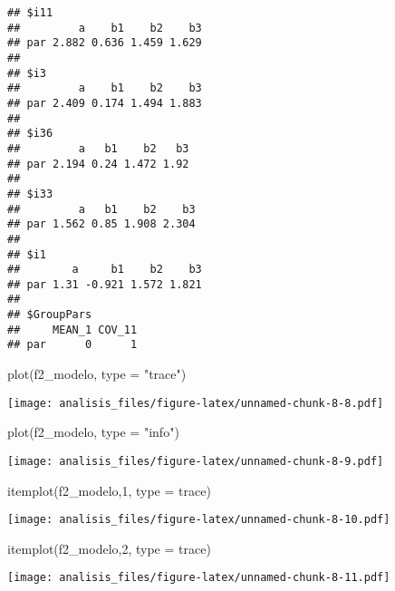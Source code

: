 \documentclass[
]{article}
\newenvironment{Shaded}{\begin{snugshade}}{\end{snugshade}}
\newcommand{\AttributeTok}[1]{\textcolor[rgb]{0.77,0.63,0.00}{#1}}
\newcommand{\DecValTok}[1]{\textcolor[rgb]{0.00,0.00,0.81}{#1}}
\newcommand{\FunctionTok}[1]{\textcolor[rgb]{0.00,0.00,0.00}{#1}}
\newcommand{\NormalTok}[1]{#1}
\newcommand{\StringTok}[1]{\textcolor[rgb]{0.31,0.60,0.02}{#1}}
\begin{document}
\begin{verbatim}
## $i11
##         a    b1    b2    b3
## par 2.882 0.636 1.459 1.629
## 
## $i3
##         a    b1    b2    b3
## par 2.409 0.174 1.494 1.883
## 
## $i36
##         a   b1    b2   b3
## par 2.194 0.24 1.472 1.92
## 
## $i33
##         a   b1    b2    b3
## par 1.562 0.85 1.908 2.304
## 
## $i1
##        a     b1    b2    b3
## par 1.31 -0.921 1.572 1.821
## 
## $GroupPars
##     MEAN_1 COV_11
## par      0      1
\end{verbatim}

\begin{Shaded}
\begin{Highlighting}[]
\FunctionTok{plot}\NormalTok{(f2\_modelo,  }\AttributeTok{type =} \StringTok{"trace"}\NormalTok{)}
\end{Highlighting}
\end{Shaded}

\texttt{[image: analisis\_files/figure-latex/unnamed-chunk-8-8.pdf]}

\begin{Shaded}
\begin{Highlighting}[]
\FunctionTok{plot}\NormalTok{(f2\_modelo,  }\AttributeTok{type =} \StringTok{"info"}\NormalTok{)}
\end{Highlighting}
\end{Shaded}

\texttt{[image: analisis\_files/figure-latex/unnamed-chunk-8-9.pdf]}

\begin{Shaded}
\begin{Highlighting}[]
\FunctionTok{itemplot}\NormalTok{(f2\_modelo,}\DecValTok{1}\NormalTok{, }\AttributeTok{type =} \StringTok{\textquotesingle{}trace\textquotesingle{}}\NormalTok{)}
\end{Highlighting}
\end{Shaded}

\texttt{[image: analisis\_files/figure-latex/unnamed-chunk-8-10.pdf]}

\begin{Shaded}
\begin{Highlighting}[]
\FunctionTok{itemplot}\NormalTok{(f2\_modelo,}\DecValTok{2}\NormalTok{, }\AttributeTok{type =} \StringTok{\textquotesingle{}trace\textquotesingle{}}\NormalTok{)}
\end{Highlighting}
\end{Shaded}

\texttt{[image: analisis\_files/figure-latex/unnamed-chunk-8-11.pdf]}
\end{document}

